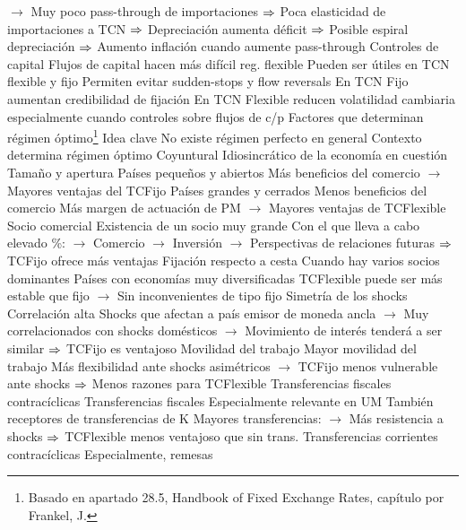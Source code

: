\documentclass{nuevotema}
\begin{document}
\begin{esquemal}
				\4[] $\to$ Muy poco pass-through de importaciones
				\4[] $\Rightarrow$ Poca elasticidad de importaciones a TCN
				\4[] $\Rightarrow$ Depreciación aumenta déficit
				\4[] $\Rightarrow$ Posible espiral depreciación
				\4[] $\Rightarrow$ Aumento inflación cuando aumente pass-through
			\3 Controles de capital
				\4 Flujos de capital hacen más difícil reg. flexible
				\4 Pueden ser útiles en TCN flexible y fijo
				\4 Permiten evitar sudden-stops y flow reversals
				\4 En TCN Fijo aumentan credibilidad de fijación
				\4 En TCN Flexible reducen volatilidad cambiaria
				\4[] especialmente cuando controles sobre flujos de c/p
		\2 Factores que determinan régimen óptimo\footnote{Basado en apartado 28.5, Handbook of Fixed Exchange Rates, capítulo por Frankel, J.}
			\3 Idea clave
				\4 No existe régimen perfecto en general
				\4 Contexto determina régimen óptimo
				\4[] Coyuntural
				\4[] Idiosincrático de la economía en cuestión
			\3[\textsc{i}] Tamaño y apertura
				\4 Países pequeños y abiertos
				\4[] Más beneficios del comercio
				\4[] $\to$ Mayores ventajas del TCFijo
				\4 Países grandes y cerrados
				\4[] Menos beneficios del comercio
				\4[] Más margen de actuación de PM
				\4[] $\to$ Mayores ventajas de TCFlexible
			\3[\textsc{ii}] Socio comercial
				\4 Existencia de un socio muy grande
				\4[] Con el que lleva a cabo elevado \%:
				\4[] $\to$ Comercio
				\4[] $\to$ Inversión
				\4[] $\to$ Perspectivas de relaciones futuras
				\4[] $\Rightarrow$ TCFijo ofrece más ventajas
				\4 Fijación respecto a cesta
				\4[] Cuando hay varios socios dominantes
				\4 Países con economías muy diversificadas
				\4[] TCFlexible puede ser más estable que fijo
				\4[] $\to$ Sin inconvenientes de tipo fijo
			 Simetría de los shocks
				\4 Correlación alta
				\4[] Shocks que afectan a país emisor de moneda ancla
				\4[] $\to$ Muy correlacionados con shocks domésticos
				\4[] $\to$ Movimiento de interés tenderá a ser similar
				\4[] $\Rightarrow$ TCFijo es ventajoso
			\3[\textsc{iv}] Movilidad del trabajo
				\4 Mayor movilidad del trabajo
				\4[] Más flexibilidad ante shocks asimétricos
				\4[] $\to$ TCFijo menos vulnerable ante shocks
				\4[] $\Rightarrow$ Menos razones para TCFlexible
			\3[\textsc{v}] Transferencias fiscales contracíclicas
				\4 Transferencias fiscales
				\4[] Especialmente relevante en UM
				\4[] También receptores de transferencias de K
				\4[] Mayores transferencias:
				\4[] $\to$ Más resistencia a shocks
				\4[] $\Rightarrow$ TCFlexible menos ventajoso que sin trans.
			\3[\textsc{vi}] Transferencias corrientes contracíclicas
				\4 Especialmente, remesas

\end{esquemal}
\end{document}
